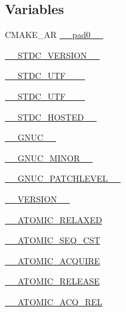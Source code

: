 \subsection*{Variables}
\begin{DoxyCompactItemize}
\item 
C\+M\+A\+K\+E\+\_\+\+AR \hyperlink{CMakeCache_8txt_a2b96b3598268f62908e4995dd2463817}{\+\_\+\+\_\+pad0\+\_\+\+\_\+}
\item 
\hyperlink{CMakeCache_8txt_aba69e7d86e970c5454fedf7e25cbf49e}{\+\_\+\+\_\+\+S\+T\+D\+C\+\_\+\+V\+E\+R\+S\+I\+O\+N\+\_\+\+\_\+}
\item 
\hyperlink{CMakeCache_8txt_a391447bc12001cf307b9fec77d32c722}{\+\_\+\+\_\+\+S\+T\+D\+C\+\_\+\+U\+T\+F\+\_\+\_\+\+\_\+}
\item 
\hyperlink{CMakeCache_8txt_aebc193933efcf54801ba103bf6d12dbb}{\+\_\+\+\_\+\+S\+T\+D\+C\+\_\+\+U\+T\+F\+\_\+\_\+\+\_\+}
\item 
\hyperlink{CMakeCache_8txt_aacc78bc040f85bfc5d36eda8c048a1fe}{\+\_\+\+\_\+\+S\+T\+D\+C\+\_\+\+H\+O\+S\+T\+E\+D\+\_\+\+\_\+}
\item 
\hyperlink{CMakeCache_8txt_a4f955bfc59f2aa5f37123f7fa8c45974}{\+\_\+\+\_\+\+G\+N\+U\+C\+\_\+\+\_\+}
\item 
\hyperlink{CMakeCache_8txt_aefc5089d158028a655f8653d849ea643}{\+\_\+\+\_\+\+G\+N\+U\+C\+\_\+\+M\+I\+N\+O\+R\+\_\+\+\_\+}
\item 
\hyperlink{CMakeCache_8txt_a68c7f08caefc9a019e0b82ec6b3fa343}{\+\_\+\+\_\+\+G\+N\+U\+C\+\_\+\+P\+A\+T\+C\+H\+L\+E\+V\+E\+L\+\_\+\+\_\+}
\item 
\hyperlink{CMakeCache_8txt_abb4404c3387f41ca320babfbcff1102f}{\+\_\+\+\_\+\+V\+E\+R\+S\+I\+O\+N\+\_\+\+\_\+}
\item 
\hyperlink{CMakeCache_8txt_acf476ec759fbe7a6aa89427ea8965872}{\+\_\+\+\_\+\+A\+T\+O\+M\+I\+C\+\_\+\+R\+E\+L\+A\+X\+ED}
\item 
\hyperlink{CMakeCache_8txt_a44cd817264eb1136dae5f3b248f8fa8e}{\+\_\+\+\_\+\+A\+T\+O\+M\+I\+C\+\_\+\+S\+E\+Q\+\_\+\+C\+ST}
\item 
\hyperlink{CMakeCache_8txt_a77baa125558a766167c49286c9873d7f}{\+\_\+\+\_\+\+A\+T\+O\+M\+I\+C\+\_\+\+A\+C\+Q\+U\+I\+RE}
\item 
\hyperlink{CMakeCache_8txt_a5738074ef1a9257e5bcb0b527c2c93a3}{\+\_\+\+\_\+\+A\+T\+O\+M\+I\+C\+\_\+\+R\+E\+L\+E\+A\+SE}
\item 
\hyperlink{CMakeCache_8txt_a93654874cdfb30676f9c0c31eb3511c0}{\+\_\+\+\_\+\+A\+T\+O\+M\+I\+C\+\_\+\+A\+C\+Q\+\_\+\+R\+EL}
\item 

\end{DoxyCompactItemize}
